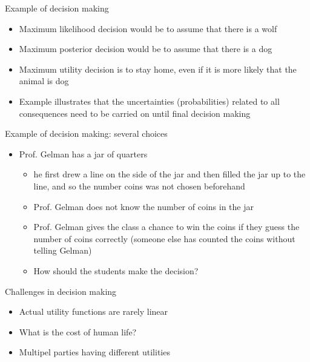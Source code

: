 \documentclass[t]{beamer}
\begin{document}
\begin{frame}
  
  {\Large\color{navyblue} Example of decision making}

  \begin{itemize}
  \item<+-> Maximum likelihood decision would be to assume that there is a wolf
  \item<+-> Maximum posterior decision would be to assume that there is a dog
  \item<+-> Maximum utility decision is to stay home, even if it is more likely that the animal is dog
  \item<+-> Example illustrates that the uncertainties (probabilities)
    related to all consequences need to be carried on until final
    decision making
  \end{itemize}

\end{frame}


\begin{frame}

{\Large\color{navyblue} Example of decision making: several choices}

\begin{itemize}
  \item Prof. Gelman has a jar of quarters
    \begin{itemize}
    \item he first drew a line on the side of the jar and then
      filled the jar up to the line, and so the number coins was not
      chosen beforehand
    \item Prof. Gelman does not know the number of coins in the jar
    \item<2-> Prof. Gelman gives the class a chance to win the coins if
      they guess the number of coins correctly (someone else has
      counted the coins without telling Gelman)
    \item<2-> How should the students make the decision?
    \end{itemize}
\end{itemize}

\end{frame}

\begin{frame}

  {\Large\color{navyblue} Challenges in decision making}

  \begin{itemize}
  \item Actual utility functions are rarely linear
  \item<2-> What is the cost of human life?
  \item<3-> Multipel parties having different utilities
  \end{itemize}
  
\end{frame}
\end{document}

